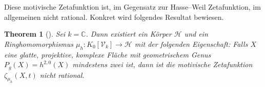 \documentclass[11pt, a4paper, english, twoside]{article}
\theoremstyle{plain}
\newtheorem{theorem}{Theorem}[section]
\theoremstyle{definition}
\newcommand{\gring}[1][k]{K_0[\mathcal{V}_#1]}
\begin{document}
Diese motivische Zetafunktion ist, im Gegensatz zur Hasse--Weil Zetafunktion, im allgemeinen nicht rational. 
Konkret wird folgendes Resultat bewiesen.
\begin{theorem}[{\cite[Thm. 1.6]{MR1996804}}]
Sei $k = \mathbb{C}$. Dann existiert ein Körper $\mathcal{H}$ und ein Ringhomomorphismus $\mu_h \colon \gring \to \mathcal{H}$ mit der folgenden
Eigenschaft: Falls $X$ eine glatte, projektive, komplexe Fläche mit geometrischem Genus $P_g(X) = h^{2,0}(X)$ mindestens zwei ist, dann ist die
motivische Zetafunktion $\zeta_{\mu_h}(X,t)$ nicht rational.
\end{theorem}


%
%
%
%
%
\end{document}

